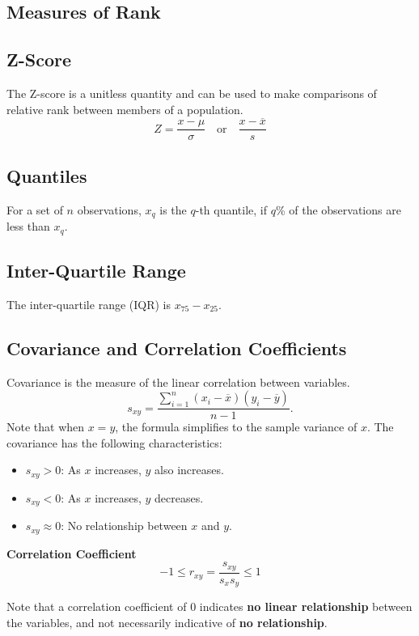 \documentclass{article}
\begin{document}
\begin{multicols}{3}
\section{Measures of Rank}
\subsection{Z-Score}
The Z-score is a unitless quantity and can be used to make comparisons of relative rank between members of a population.
\begin{equation*}
    Z = \frac{x  - \mu}{\sigma} \quad \text{or} \quad \frac{x - \overline{x}}{s}
\end{equation*}
\subsection{Quantiles}
For a set of \(n\) observations, \(x_q\) is the \(q\)-th quantile, if \(q\)\% of the observations are less than \(x_q\).
\subsection{Inter-Quartile Range}
The inter-quartile range (IQR) is \(x_{75} - x_{25}\).
\subsection{Covariance and Correlation Coefficients}
Covariance is the measure of the linear correlation between variables.
\begin{equation*}
    s_{xy} = \frac{\sum_{i = 1}^n \left( x_i - \overline{x} \right) \left( y_i - \overline{y} \right)}{n - 1}.
\end{equation*}
Note that when \(x = y\), the formula simplifies to the sample variance of \(x\).
The covariance has the following characteristics:
\begin{itemize}
    \item \(s_{xy} > 0\): As \(x\) increases, \(y\) also increases.
    \item \(s_{xy} < 0\): As \(x\) increases, \(y\) decreases.
    \item \(s_{xy} \approx 0\): No relationship between \(x\) and \(y\).
\end{itemize}
\textbf{Correlation Coefficient}
\begin{equation*}
    -1 \le r_{xy} = \frac{s_{xy}}{s_x s_y} \le 1
\end{equation*}

Note that a correlation coefficient of \(0\)
indicates \textbf{no linear relationship} between the variables, and not necessarily indicative of \textbf{no relationship}.



\end{multicols}
\end{document}
